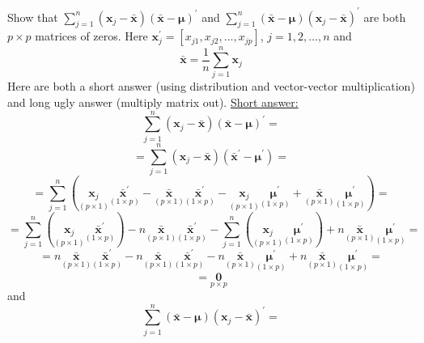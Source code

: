 Show that $\sum_{j=1}^{n}{(\textbf{x}_{j} - \bar{\textbf{x}}){(\bar{\textbf{x}} - \bm{\mu})}^{\prime}}$ and $\sum_{j=1}^{n}{(\bar{\textbf{x}} - \bm{\mu}){(\textbf{x}_{j} - \bar{\textbf{x}})}^{\prime}}$ are both $p \times p$ matrices of zeros. Here $\textbf{x}_{j}^{\prime} = [x_{j1}, x_{j2}, \dots, x_{jp}]$, $j=1,2,\dots,n$ and
\[
    \bar{\textbf{x}}
    =
    \frac{1}{n}
    \sum_{j=1}^{n}{\textbf{x}_{j}}
\]
Here are both a short answer (using distribution and vector-vector multiplication) and long ugly answer (multiply matrix out).
\newline
\underline{Short answer:}
\[
    \sum_{j=1}^{n}{
        (\textbf{x}_{j} - \bar{\textbf{x}})
        {(\bar{\textbf{x}} - \bm{\mu})}^{\prime}
    }
    =
\]
\[
    =
    \sum_{j=1}^{n}{
        (\textbf{x}_{j} - \bar{\textbf{x}})
        {(\bar{\textbf{x}}^{\prime} - \bm{\mu}^{\prime})}
    }
    =
\]
\[
    =
    \sum_{j=1}^{n}{
        \left(
            \underset{(p \times 1)}{\textbf{x}_{j}}
            \underset{(1 \times p)}{\bar{\textbf{x}}^{\prime}}
            -
            \underset{(p \times 1)}{\bar{\textbf{x}}}
            \underset{(1 \times p)}{\bar{\textbf{x}}^{\prime}}
            -
            \underset{(p \times 1)}{\textbf{x}_{j}}
            \underset{(1 \times p)}{\bm{\mu}^{\prime}}
            +
            \underset{(p \times 1)}{\bar{\textbf{x}}}
            \underset{(1 \times p)}{\bm{\mu}^{\prime}}
        \right)
    }
    =
\]
\[
    =
    \sum_{j=1}^{n}{
        \left(
            \underset{(p \times 1)}{\textbf{x}_{j}}
            \underset{(1 \times p)}{\bar{\textbf{x}}^{\prime}}
        \right)
    }
    -
    n
    \underset{(p \times 1)}{\bar{\textbf{x}}}
    \underset{(1 \times p)}{\bar{\textbf{x}}^{\prime}}
    -
    \sum_{j=1}^{n}{
        \left(
            \underset{(p \times 1)}{\textbf{x}_{j}}
            \underset{(1 \times p)}{\bm{\mu}^{\prime}}
        \right)
    }
    +
    n
    \underset{(p \times 1)}{\bar{\textbf{x}}}
    \underset{(1 \times p)}{\bm{\mu}^{\prime}}
    =
\]
\[
    =
    n
    \underset{(p \times 1)}{\bar{\textbf{x}}}
    \underset{(1 \times p)}{\bar{\textbf{x}}^{\prime}}
    -
    n
    \underset{(p \times 1)}{\bar{\textbf{x}}}
    \underset{(1 \times p)}{\bar{\textbf{x}}^{\prime}}
    -
    n
    \underset{(p \times 1)}{\bar{\textbf{x}}}
    \underset{(1 \times p)}{\bm{\mu}^{\prime}}
    +
    n
    \underset{(p \times 1)}{\bar{\textbf{x}}}
    \underset{(1 \times p)}{\bm{\mu}^{\prime}}
    =
\]
\[
    =
    \underset{p \times p}{\textbf{0}}
\]
and
\[
    \sum_{j=1}^{n}{
        (\bar{\textbf{x}} - \bm{\mu})
        {(\textbf{x}_{j} - \bar{\textbf{x}})}^{\prime}
        }
    =
\]
